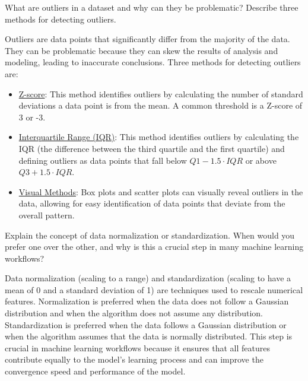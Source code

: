 \begin{ejercicio}
    What are outliers in a dataset and why can they be problematic? Describe three methods for detecting outliers.

    Outliers are data points that significantly differ from the majority of the data. They can be problematic because they can skew the results of analysis and modeling, leading to inaccurate conclusions. Three methods for detecting outliers are:
\begin{itemize}
    \item \ul{Z-score}: This method identifies outliers by calculating the number of standard deviations a data point is from the mean. A common threshold is a Z-score of 3 or -3.
    \item \ul{Interquartile Range (IQR)}: This method identifies outliers by calculating the IQR (the difference between the third quartile and the first quartile) and defining outliers as data points that fall below $Q1 - 1.5 \cdot IQR$ or above $Q3 + 1.5 \cdot IQR$.
    \item \ul{Visual Methods}: Box plots and scatter plots can visually reveal outliers in the data, allowing for easy identification of data points that deviate from the overall pattern.
\end{itemize}
\end{ejercicio}


\begin{ejercicio}
    Explain the concept of data normalization or standardization. When would you prefer one over the other, and why is this a crucial step in many machine learning workflows?

    Data normalization (scaling to a range) and standardization (scaling to have a mean of 0 and a standard deviation of 1) are techniques used to rescale numerical features. Normalization is preferred when the data does not follow a Gaussian distribution and when the algorithm does not assume any distribution. Standardization is preferred when the data follows a Gaussian distribution or when the algorithm assumes that the data is normally distributed. This step is crucial in machine learning workflows because it ensures that all features contribute equally to the model's learning process and can improve the convergence speed and performance of the model.
\end{ejercicio}